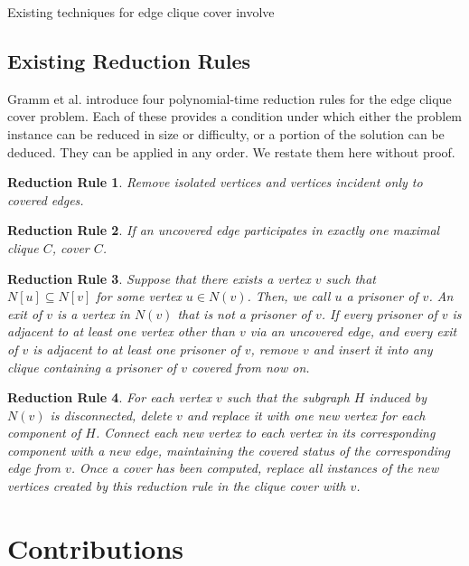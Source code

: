 \documentclass[12pt]{article}
\newtheorem{rrule}{Reduction Rule}
\begin{document}
    Existing techniques for edge clique cover involve 

\newpage\subsection*{Existing Reduction Rules}

    Gramm et al. introduce four polynomial-time reduction rules for the edge clique cover problem.
    Each of these provides a condition under which either the problem instance can be reduced in size or difficulty, or a portion of the solution can be deduced.
    They can be applied in any order.
    We restate them here without proof.

    \begin{rrule}
        Remove isolated vertices and vertices incident only to covered edges.
    \end{rrule}

    \begin{rrule}
        If an uncovered edge participates in exactly one maximal clique $C$, cover $C$.
    \end{rrule}

    \begin{rrule}
        Suppose that there exists a vertex $v$ such that $N[u] \subseteq N[v]$ for some vertex $u \in N(v)$.
        Then, we call $u$ a prisoner of $v$.
        An exit of $v$ is a vertex in $N(v)$ that is not a prisoner of $v$.
        If every prisoner of $v$ is adjacent to at least one vertex other than $v$ via an uncovered edge, and every exit of $v$ is adjacent to at least one prisoner of $v$, remove $v$ and insert it into any clique containing a prisoner of $v$ covered from now on.
    \end{rrule}

    \begin{rrule}
        For each vertex $v$ such that the subgraph $H$ induced by $N(v)$ is disconnected, delete $v$ and replace it with one new vertex for each component of $H$.
        Connect each new vertex to each vertex in its corresponding component with a new edge, maintaining the covered status of the corresponding edge from $v$.
        Once a cover has been computed, replace all instances of the new vertices created by this reduction rule in the clique cover with $v$.
    \end{rrule}


\section*{Contributions}
\end{document}
